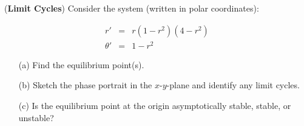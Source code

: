 \documentclass[11pt,letterpaper,boxed]{pset}
\begin{document}
\begin{problem} [Exercise 7.]
    (\textbf{Limit Cycles}) Consider the system (written in polar coordinates):
    
    \begin{eqnarray*}
        r' &  = &  r(1-r^2)(4-r^2)  \\
        \theta'  & = &  1-r^2
    \end{eqnarray*}
    
    \begin{itemize}
        \item[(a)] Find the equilibrium point(s).   
        \item[(b)] Sketch the phase portrait in the $x$-$y$-plane and identify any limit cycles. 
        \item[(c)] Is the equilibrium point at the origin asymptotically stable, stable, or unstable?
    \end{itemize}
\end{problem}
\newpage
\end{document}
